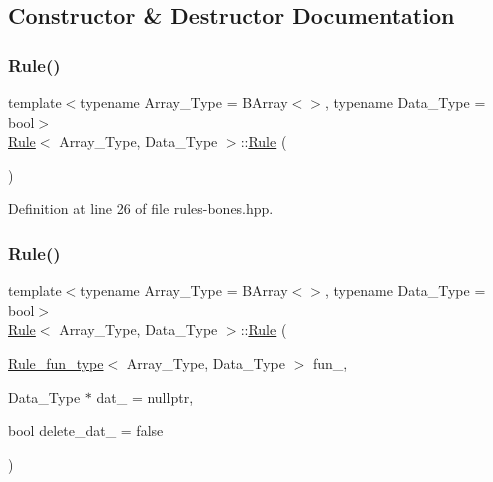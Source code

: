 \subsection{Constructor \& Destructor Documentation}
\mbox{\label{class_rule_aef92e54d53dc77b5cad2f819b5f8f4bf}} 
\subsubsection{\texorpdfstring{Rule()}{Rule()}\hspace{0.1cm}{\footnotesize\ttfamily [1/2]}}
{\footnotesize\ttfamily template$<$typename Array\+\_\+\+Type = B\+Array$<$$>$, typename Data\+\_\+\+Type = bool$>$ \\
\hyperlink{class_rule}{Rule}$<$ Array\+\_\+\+Type, Data\+\_\+\+Type $>$\+::\hyperlink{class_rule}{Rule} (\begin{DoxyParamCaption}{ }\end{DoxyParamCaption})\hspace{0.3cm}{\ttfamily [inline]}}



Definition at line 26 of file rules-\/bones.\+hpp.

\mbox{\label{class_rule_ad0b81db664bed03f9a381f90ab617424}} 
\subsubsection{\texorpdfstring{Rule()}{Rule()}\hspace{0.1cm}{\footnotesize\ttfamily [2/2]}}
{\footnotesize\ttfamily template$<$typename Array\+\_\+\+Type = B\+Array$<$$>$, typename Data\+\_\+\+Type = bool$>$ \\
\hyperlink{class_rule}{Rule}$<$ Array\+\_\+\+Type, Data\+\_\+\+Type $>$\+::\hyperlink{class_rule}{Rule} (\begin{DoxyParamCaption}\item[{\hyperlink{typedefs_8hpp_a2e147c9c0e8b65be614c98a5dd400d5c}{Rule\+\_\+fun\+\_\+type}$<$ Array\+\_\+\+Type, Data\+\_\+\+Type $>$}]{fun\+\_\+,  }\item[{Data\+\_\+\+Type $\ast$}]{dat\+\_\+ = {\ttfamily nullptr},  }\item[{bool}]{delete\+\_\+dat\+\_\+ = {\ttfamily false} }\end{DoxyParamCaption})\hspace{0.3cm}{\ttfamily [inline]}}



